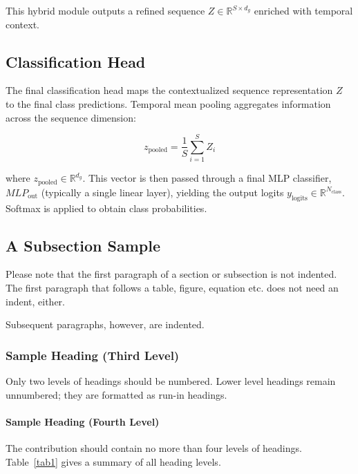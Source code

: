 \documentclass[runningheads]{llncs}
\begin{document}
This hybrid module outputs a refined sequence $Z \in \mathbb{R}^{S \times d_g}$ enriched with temporal context.



\subsection{Classification Head}

\label{subsec:classification_head_v3}



The final classification head maps the contextualized sequence representation $Z$ to the final class predictions. Temporal mean pooling aggregates information across the sequence dimension:

\begin{equation}
    z_{\text{pooled}} = \frac{1}{S} \sum_{i=1}^{S} Z_i
    \label{eq:pooling}
\end{equation}

where $z_{\text{pooled}} \in \mathbb{R}^{d_g}$. This vector is then passed through a final MLP classifier, $MLP_{\text{out}}$ (typically a single linear layer), yielding the output logits $y_{\text{logits}} \in \mathbb{R}^{N_{\text{class}}}$. Softmax is applied to obtain class probabilities.


\subsection{A Subsection Sample}
Please note that the first paragraph of a section or subsection is
not indented. The first paragraph that follows a table, figure,
equation etc. does not need an indent, either.

Subsequent paragraphs, however, are indented.

\subsubsection{Sample Heading (Third Level)} Only two levels of
headings should be numbered. Lower level headings remain unnumbered;
they are formatted as run-in headings.

\paragraph{Sample Heading (Fourth Level)}
The contribution should contain no more than four levels of
headings. Table~\ref{tab1} gives a summary of all heading levels.
\end{document}
